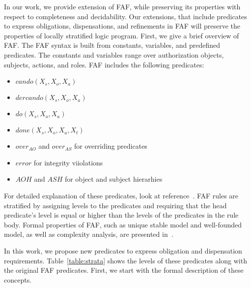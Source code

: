 \documentclass[12pt,journal,letterpaper,onecolumn]{IEEEtran}
\begin{document}
In our work, we provide extension of FAF, while preserving its 
properties with respect to completeness and decidability. 
 Our extensions, that include predicates to express obligations,
dispensations, and refinements in FAF will preserve the 
properties of locally stratified logic program.
First, we give a brief overview of FAF.  The FAF syntax is built from constants, variables, and
predefined predicates.  The constants and variables range over authorization objects, subjects,
actions, and roles.  FAF includes the following predicates:
\begin{itemize}
\item $cando(X_s,X_o,X_a)$
\item $dercando(X_s,X_o,X_a)$
\item $do(X_s,X_o,X_a)$
\item $done(X_s,X_o,X_a,X_t)$
\item $over_{AO}$ and $over_{AS}$ for overriding predicates
\item $error$ for integrity viiolations
\item $AOH$ and $ASH$ for object and subject hierarhies
\end{itemize}
For detailed explanation of these predicates, look at reference~\cite{Jajodia01}.  FAF rules
are stratified by assigning levels to the predicates and requiring that the head predicate's
level is equal or higher than the levels of the predicates in the rule body.
Formal properties of FAF, such as unique stable model and well-founded model, as well as complexity
analysis, are presented in~\cite{Jajodia01}.

In this work, we propose new predicates to express obligation and dispensation requirements. Table~\ref{table:strata} shows the levels of these predicates along with the original FAF
predicates.  First, we start with the formal description of
these concepts.
\end{document}
